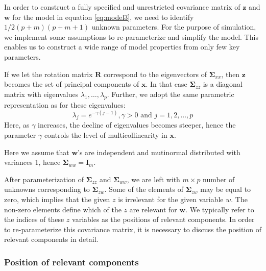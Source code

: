 \documentclass[3p,times,12pt,authoryear]{elsarticle}
\providecommand{\tightlist}{%
  \setlength{\itemsep}{0pt}\setlength{\parskip}{0pt}}
\theoremstyle{definition}
\theoremstyle{definition}
\theoremstyle{remark}
\begin{document}
In order to construct a fully specified and unrestricted covariance
matrix of \(\mathbf{z}\) and \(\mathbf{w}\) for the model in equation
\eqref{eq:model3}, we need to identify \(1/2 (p+m)(p+m+1)\) unknown
parameters. For the purpose of simulation, we implement some assumptions
to re-parameterize and simplify the model. This enables us to construct
a wide range of model properties from only few key parameters.

\begin{description}
\tightlist
\item[\textbf{Parameterization of \(\boldsymbol{\Sigma}_{zz}\)}]
If we let the rotation matrix \(\mathbf{R}\) correspond to the
eigenvectors of \(\boldsymbol{\Sigma}_{xx}\), then \(\mathbf{z}\)
becomes the set of principal components of \(\mathbf{x}\). In that case
\(\boldsymbol{\Sigma}_{zz}\) is a diagonal matrix with eigenvalues
\(\lambda_1, \ldots, \lambda_p\). Further, we adopt the same parametric
representation as \citet{saebo2015simrel} for these eigenvalues:
\[\lambda_j = e^{-\gamma(j - 1)}, \gamma >0 \text{ and } j = 1, 2, \ldots, p\]
Here, as \(\gamma\) increases, the decline of eigenvalues becomes
steeper, hence the parameter \(\gamma\) controls the level of
multicollinearity in \(\mathbf{x}\).
\item[\textbf{Parameterization of \(\boldsymbol{\Sigma}_{ww}\)}]
Here we assume that \(\mathbf{w}\)'s are independent and mutinormal
distributed with variances 1, hence
\(\boldsymbol{\Sigma}_{ww} = \mathbf{I}_m\).
\item[\textbf{Parameterization of \(\boldsymbol{\Sigma}_{zw}\)}]
After parameterization of \(\boldsymbol{\Sigma}_{zz}\) and
\(\boldsymbol{\Sigma}_{ww}\), we are left with \(m \times p\) number of
unknowns corresponding to \(\boldsymbol{\Sigma}_{zw}\). Some of the
elements of \(\boldsymbol{\Sigma}_{zw}\) may be equal to zero, which
implies that the given \(z\) is irrelevant for the given variable \(w\).
The non-zero elements define which of the \(z\) are relevant for
\(\mathbf{w}\). We typically refer to the indices of these \(z\)
variables as the positions of relevant components. In order to
re-parameterize this covariance matrix, it is necessary to discuss the
position of relevant components in detail.
\end{description}

\subsubsection{Position of relevant
components}\label{position-of-relevant-components}
\end{document}
